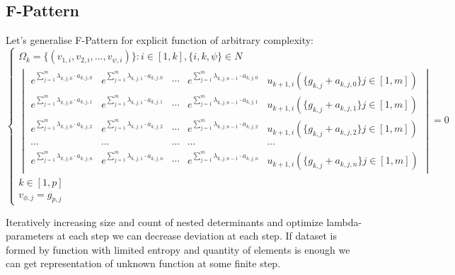 \documentclass[a4paper, 11pt, oneside]{book}
\begin{document}
\subsection{F-Pattern}
Let's generalise F-Pattern for explicit function of arbitrary complexity:
\begin{equation}\label{eq:f-pattern}
  \begin{cases}
    \Omega_k = \{(v_{1, i}, v_{2, i}, \ldots, v_{\psi, i})\}: i \in [1, k], \{i, k, \psi\} \in N \\
    \begin{vmatrix}
      e^{\sum_{j = 1}^m \lambda_{k, j, 0} \cdot a_{k, j, 0}} & e^{\sum_{j = 1}^m \lambda_{k, j, 1} \cdot a_{k, j, 0}} & \cdots & e^{\sum_{j = 1}^m \lambda_{k, j, n - 1} \cdot a_{k, j, 0}} & u_{k+1, i}(\{g_{k, j} + a_{k, j, 0}\} j \in [1, m]) \\
      e^{\sum_{j = 1}^m \lambda_{k, j, 0} \cdot a_{k, j, 1}} & e^{\sum_{j = 1}^m \lambda_{k, j, 1} \cdot a_{k, j, 1}} & \cdots & e^{\sum_{j = 1}^m \lambda_{k, j, n - 1} \cdot a_{k, j, 1}} & u_{k+1, i}(\{g_{k, j} + a_{k, j, 1}\} j \in [1, m]) \\
      e^{\sum_{j = 1}^m \lambda_{k, j, 0} \cdot a_{k, j, 2}} & e^{\sum_{j = 1}^m \lambda_{k, j, 1} \cdot a_{k, j, 2}} & \cdots & e^{\sum_{j = 1}^m \lambda_{k, j, n - 1} \cdot a_{k, j, 2}} & u_{k+1, i}(\{g_{k, j} + a_{k, j, 2}\} j \in [1, m]) \\
      \cdots & \cdots & \cdots & \cdots & \cdots \\
      e^{\sum_{j = 1}^m \lambda_{k, j, 0} \cdot a_{k, j, n}} & e^{\sum_{j = 1}^m \lambda_{k, j, 1} \cdot a_{k, j, n}} & \cdots & e^{\sum_{j = 1}^m \lambda_{k, j, n - 1} \cdot a_{k, j, n}} & u_{k+1, i}(\{g_{k, j} + a_{k, j, n}\} j \in [1, m])
    \end{vmatrix}
    =0 \\
    k \in [1, p] \\
    v_{\phi, j} = g_{p, j}
  \end{cases}
\end{equation}

Iteratively increasing size and count of nested determinants and optimize lambda-parameters at each step we can decrease deviation at each step. If dataset is formed by function with limited entropy and quantity of elements is enough we can get representation of unknown function at some finite step.
\end{document}
